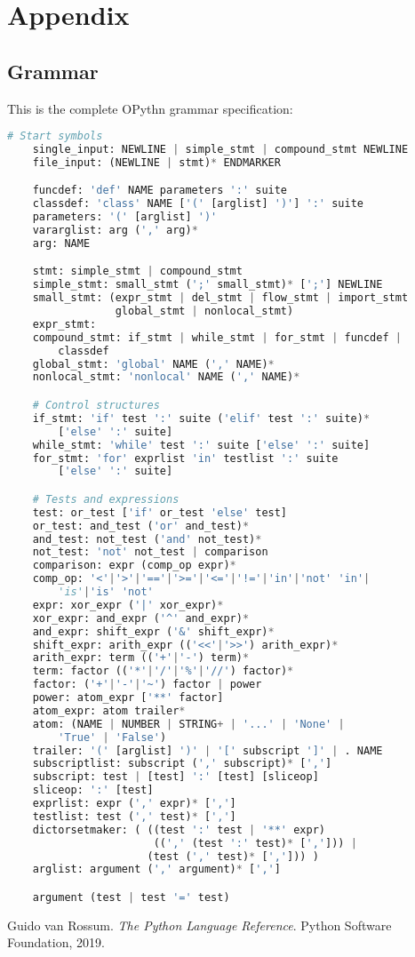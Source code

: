 \documentclass[11pt, twoside]{article}
\begin{document}
    \section{Appendix}
    \subsection{Grammar}
    This is the complete OPythn grammar specification:
    \begin{lstlisting}[language=python]
    # Start symbols
    single_input: NEWLINE | simple_stmt | compound_stmt NEWLINE
    file_input: (NEWLINE | stmt)* ENDMARKER

    funcdef: 'def' NAME parameters ':' suite
    classdef: 'class' NAME ['(' [arglist] ')'] ':' suite
    parameters: '(' [arglist] ')'
    vararglist: arg (',' arg)*
    arg: NAME

    stmt: simple_stmt | compound_stmt
    simple_stmt: small_stmt (';' small_stmt)* [';'] NEWLINE
    small_stmt: (expr_stmt | del_stmt | flow_stmt | import_stmt
                 global_stmt | nonlocal_stmt)
    expr_stmt:
    compound_stmt: if_stmt | while_stmt | for_stmt | funcdef |
        classdef
    global_stmt: 'global' NAME (',' NAME)*
    nonlocal_stmt: 'nonlocal' NAME (',' NAME)*

    # Control structures
    if_stmt: 'if' test ':' suite ('elif' test ':' suite)*
        ['else' ':' suite]
    while_stmt: 'while' test ':' suite ['else' ':' suite]
    for_stmt: 'for' exprlist 'in' testlist ':' suite
        ['else' ':' suite]

    # Tests and expressions
    test: or_test ['if' or_test 'else' test]
    or_test: and_test ('or' and_test)*
    and_test: not_test ('and' not_test)*
    not_test: 'not' not_test | comparison
    comparison: expr (comp_op expr)*
    comp_op: '<'|'>'|'=='|'>='|'<='|'!='|'in'|'not' 'in'|
        'is'|'is' 'not'
    expr: xor_expr ('|' xor_expr)*
    xor_expr: and_expr ('^' and_expr)*
    and_expr: shift_expr ('&' shift_expr)*
    shift_expr: arith_expr (('<<'|'>>') arith_expr)*
    arith_expr: term (('+'|'-') term)*
    term: factor (('*'|'/'|'%'|'//') factor)*
    factor: ('+'|'-'|'~') factor | power
    power: atom_expr ['**' factor]
    atom_expr: atom trailer*
    atom: (NAME | NUMBER | STRING+ | '...' | 'None' |
        'True' | 'False')
    trailer: '(' [arglist] ')' | '[' subscript ']' | . NAME
    subscriptlist: subscript (',' subscript)* [',']
    subscript: test | [test] ':' [test] [sliceop]
    sliceop: ':' [test]
    exprlist: expr (',' expr)* [',']
    testlist: test (',' test)* [',']
    dictorsetmaker: ( ((test ':' test | '**' expr)
                       ((',' (test ':' test)* [','])) |
                      (test (',' test)* [','])) )
    arglist: argument (',' argument)* [',']

    argument (test | test '=' test)
    \end{lstlisting}

\begin{thebibliography}{1}
     Guido van Rossum. \textit{The Python Language Reference}. Python Software Foundation, 2019.
\end{thebibliography}
\end{document}
